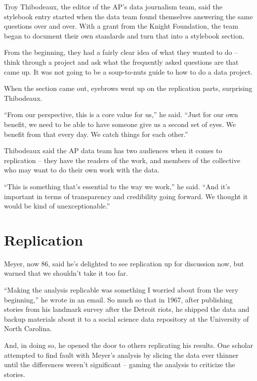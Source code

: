 \documentclass[
  letterpaper,
  DIV=11,
  numbers=noendperiod]{scrreprt}
\begin{document}
Troy Thibodeaux, the editor of the AP's data journalism team, said the
stylebook entry started when the data team found themselves answering
the same questions over and over. With a grant from the Knight
Foundation, the team began to document their own standards and turn that
into a stylebook section.

From the beginning, they had a fairly clear idea of what they wanted to
do -- think through a project and ask what the frequently asked
questions are that came up. It was not going to be a soup-to-nuts guide
to how to do a data project.

When the section came out, eyebrows went up on the replication parts,
surprising Thibodeaux.

``From our perspective, this is a core value for us,'' he said. ``Just
for our own benefit, we need to be able to have someone give us a second
set of eyes. We benefit from that every day. We catch things for each
other.''

Thibodeaux said the AP data team has two audiences when it comes to
replication -- they have the readers of the work, and members of the
collective who may want to do their own work with the data.

``This is something that's essential to the way we work,'' he said.
``And it's important in terms of transparency and credibility going
forward. We thought it would be kind of unexceptionable.''

\hypertarget{replication}{%
\section{Replication}\label{replication}}

Meyer, now 86, said he's delighted to see replication up for discussion
now, but warned that we shouldn't take it too far.

``Making the analysis replicable was something I worried about from the
very beginning,'' he wrote in an email. So much so that in 1967, after
publishing stories from his landmark survey after the Detroit riots, he
shipped the data and backup materials about it to a social science data
repository at the University of North Carolina.

And, in doing so, he opened the door to others replicating his results.
One scholar attempted to find fault with Meyer's analysis by slicing the
data ever thinner until the differences weren't significant -- gaming
the analysis to criticize the stories.
\end{document}
